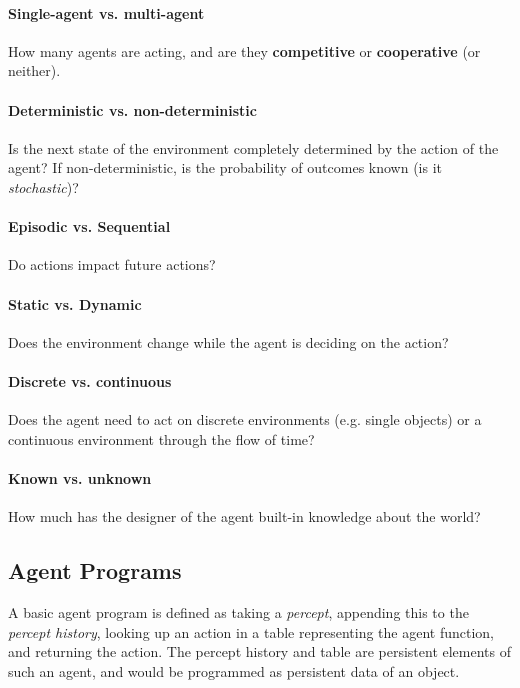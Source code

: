\paragraph{Single-agent vs. multi-agent} How many agents are acting, and are they \textbf{competitive} or \textbf{cooperative} (or neither).

\paragraph{Deterministic vs. non-deterministic} Is the next state of the environment completely determined by the action of the agent? If non-deterministic, is the probability of outcomes known (is it \textit{stochastic})?

\paragraph{Episodic vs. Sequential} Do actions impact future actions?

\paragraph{Static vs. Dynamic} Does the environment change while the agent is deciding on the action?

\paragraph{Discrete vs. continuous} Does the agent need to act on discrete environments (e.g. single objects) or a continuous environment through the flow of time?

\paragraph{Known vs. unknown} How much has the designer of the agent built-in knowledge about the world?


\subsection{Agent Programs}

A basic agent program is defined as taking a \textit{percept}, appending this to the \textit{percept history}, looking up an action in a table representing the agent function, and returning the action. The percept history and table are persistent elements of such an agent, and would be programmed as persistent data of an object.

